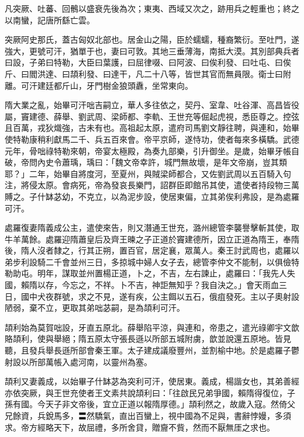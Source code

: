 \begin{pinyinscope}
 凡突厥、吐蕃、回鶻以盛衰先後為次；東夷、西域又次之，跡用兵之輕重也；終之以南蠻，記唐所繇亡雲。



 突厥阿史那氏，蓋古匈奴北部也。居金山之陽，臣於蠕蠕，種裔繁衍。至吐門，遂強大，更號可汗，猶單于也，妻曰可敦。其地三垂薄海，南抵大漠。其別部典兵者曰設，子弟曰特勒，大臣曰葉護，曰屈律啜、曰阿波、曰俟利發、曰吐屯、曰俟斤、曰閻洪達、曰頡利發、曰達干，凡二十八等，皆世其官而無員限。衛士曰附離。可汗建廷都斤山，牙門樹金狼頭纛，坐常東向。



 隋大業之亂，始畢可汗咄吉嗣立，華人多往依之，契丹、室韋、吐谷渾、高昌皆役屬，竇建德、薛舉、劉武周、梁師都、李軌、王世充等倔起虎視，悉臣尊之。控弦且百萬，戎狄熾強，古未有也。高祖起太原，遣府司馬劉文靜往聘，與連和，始畢使特勒康稍利獻馬二千、兵五百來會。帝平京師，遂恃功，使者每來多橫驕。武德元年，骨咄祿特勒來朝，帝宴太極殿，為奏九部樂，引升御坐。是歲，始畢牙帳自破，帝問內史令蕭瑀，瑀曰：「魏文帝幸許，城門無故壞，是年文帝崩，豈其類耶？」二年，始畢自將度河，至夏州，與賊梁師都合，又佐劉武周以五百騎入句注，將侵太原。會病死，帝為發哀長樂門，詔群臣即館吊其使，遣使者持段物三萬賻之。子什缽苾幼，不克立，以為泥步設，使居東偏，立其弟俟利弗設，是為處羅可汗。



 處羅復妻隋義成公主，遣使來告，則又潛通王世充，潞州總管李襲譽擊斬其使，取牛羊萬餘。處羅迎隋蕭皇后及齊王暕之子正道於竇建德所，因立正道為隋王，奉隋後，隋人沒者隸之，行其正朔，置百官，居定襄，眾萬人。秦王討武周也，處羅以弟步利設騎二千會並州三日，多掠城中婦人女子去，總管李仲文不能制，以俱儉特勒助屯。明年，謀取並州置楊正道，卜之，不吉，左右諫止，處羅曰：「我先人失國，賴隋以存，今忘之，不祥。卜不吉，神詎無知乎？我自決之。」會天雨血三日，國中犬夜群號，求之不見，遂有疾，公主餌以五石，俄疽發死。主以子奧射設陋弱，棄不立，更取其弟咄苾嗣，是為頡利可汗。



 頡利始為莫賀咄設，牙直五原北。薛舉陷平涼，與連和，帝患之，遣光祿卿宇文歆賂頡利，使與舉絕；隋五原太守張長遜以所部五城附虜，歆並說還五原地。皆見聽，且發兵舉長遜所部會秦王軍。太子建成議廢豐州，並割榆中地。於是處羅子鬱射設以所部萬帳入處河南，以靈州為塞。



 頡利又妻義成，以始畢子什缽苾為突利可汗，使居東。義成，楊諧女也，其弟善經亦依突厥，與王世充使者王文素共說頡利曰：「往啟民兄弟爭國，賴隋得復位，子孫有國。今天子非文帝後，宜立正道以報隋厚德。」頡利然之，故歲入寇。然倚父兄餘資，兵銳馬多，〓然驕氣，直出百蠻上，視中國為不足與，書辭悖嫚，多須求。帝方經略天下，故屈禮，多所舍貸，贈齎不貲，然而不厭無厓之求也。




\end{pinyinscope}
